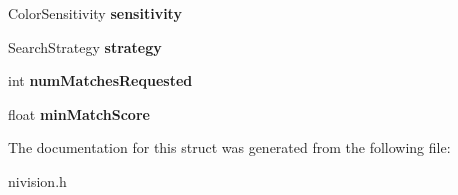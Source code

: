 \begin{DoxyCompactItemize}
\item 
\hypertarget{structMatchColorPatternOptions__struct_a8aae7a7c45039c97078e67496cba7ce4}{
ColorSensitivity {\bfseries sensitivity}}
\label{structMatchColorPatternOptions__struct_a8aae7a7c45039c97078e67496cba7ce4}

\item 
\hypertarget{structMatchColorPatternOptions__struct_a03d60ed16f920ca07e649af96773db15}{
SearchStrategy {\bfseries strategy}}
\label{structMatchColorPatternOptions__struct_a03d60ed16f920ca07e649af96773db15}

\item 
\hypertarget{structMatchColorPatternOptions__struct_ad6212a25d7c1eefbfb90e5dd1a8a6bd1}{
int {\bfseries numMatchesRequested}}
\label{structMatchColorPatternOptions__struct_ad6212a25d7c1eefbfb90e5dd1a8a6bd1}

\item 
\hypertarget{structMatchColorPatternOptions__struct_a1f1df0042a1fec9617ff589c08b9047a}{
float {\bfseries minMatchScore}}
\label{structMatchColorPatternOptions__struct_a1f1df0042a1fec9617ff589c08b9047a}

\end{DoxyCompactItemize}


The documentation for this struct was generated from the following file:\begin{DoxyCompactItemize}
\item 
nivision.h\end{DoxyCompactItemize}

